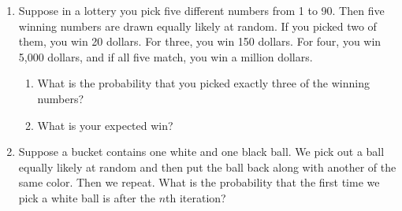\documentclass[12pt]{article}
\begin{document}
\begin{enumerate}
\item Suppose in a lottery you pick five different numbers from 1 to 90. Then five winning numbers are drawn equally likely at random. If you picked two of them, you win 20 dollars. For three, you win 150 dollars. For four, you win 5,000 dollars, and if all five match, you win a million dollars.
\begin{enumerate}
\item What is the probability that you picked exactly three of the winning numbers?
\item What is your expected win?
\end{enumerate}

\item Suppose a bucket contains one white and one black ball. We pick out a ball equally likely at random and then put the ball back along with another of the same color. Then we repeat. What is the probability that the first time we pick a white ball is after the $n$th iteration?

\end{enumerate}
\end{document}
